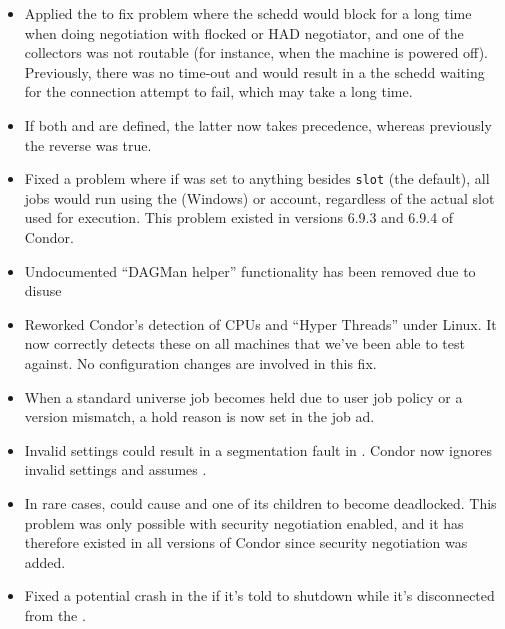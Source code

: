 \begin{itemize}
\item Applied the  to fix problem where the schedd 
would block for a long time when doing negotiation with flocked or HAD 
negotiator, and one of the collectors was not routable (for instance, when 
the machine is powered off). Previously, there was no time-out and would
result in a the schedd waiting for the connection attempt to fail, which may
take a long time.

\item If both  and
 are defined, the latter
now takes precedence, whereas previously the reverse was true.

\item Fixed a problem where if  was
set to anything besides \texttt{slot} (the default), all jobs would
run using the  (Windows) or
 account, regardless of the actual slot used for
execution. This problem existed in versions 6.9.3 and 6.9.4 of Condor.

\item Undocumented ``DAGMan helper'' functionality has been removed
  due to disuse

\item Reworked Condor's detection of CPUs and ``Hyper Threads'' under
  Linux.  It now correctly detects these on all machines that we've
  been able to test against.  No configuration changes are involved in
  this fix.

\item When a standard universe job becomes held due to user job policy or
a version mismatch, a hold reason is now set in the job ad.

\item Invalid  settings could result in a 
segmentation fault in . 
Condor now ignores invalid settings and assumes .

\item In rare cases,  could cause  and
one of its children to become deadlocked.  This problem was only
possible with security negotiation enabled, and it has therefore
existed in all versions of Condor since security negotiation was
added.

\item Fixed a potential crash in the  if it's told to
shutdown while it's disconnected from the .


\end{itemize}

